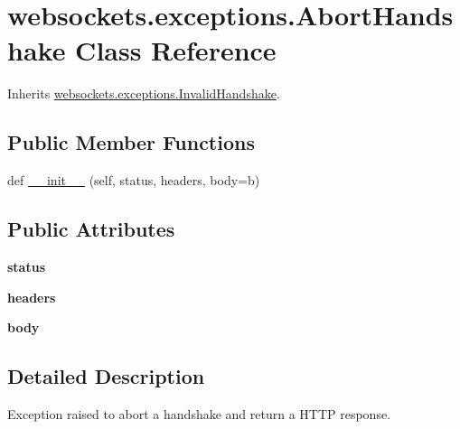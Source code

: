 \hypertarget{classwebsockets_1_1exceptions_1_1_abort_handshake}{}\section{websockets.\+exceptions.\+Abort\+Handshake Class Reference}
\label{classwebsockets_1_1exceptions_1_1_abort_handshake}


Inherits \hyperlink{classwebsockets_1_1exceptions_1_1_invalid_handshake}{websockets.\+exceptions.\+Invalid\+Handshake}.

\subsection*{Public Member Functions}
\begin{DoxyCompactItemize}
\item 
def \hyperlink{classwebsockets_1_1exceptions_1_1_abort_handshake_a0961854c8a62497d3c1ff4cc5ed4d9e0}{\+\_\+\+\_\+init\+\_\+\+\_\+} (self, status, headers, body=b\textquotesingle{}\textquotesingle{})
\end{DoxyCompactItemize}
\subsection*{Public Attributes}
\begin{DoxyCompactItemize}
\item 
\mbox{\label{classwebsockets_1_1exceptions_1_1_abort_handshake_a96e575e66ae2791615b360c3f9dcef9e}} 
{\bfseries status}
\item 
\mbox{\label{classwebsockets_1_1exceptions_1_1_abort_handshake_a4efd1b3a32bfb66ba3fdb409aad02ee3}} 
{\bfseries headers}
\item 
\mbox{\label{classwebsockets_1_1exceptions_1_1_abort_handshake_a177164eeae57ed15c71ae311ec596505}} 
{\bfseries body}
\end{DoxyCompactItemize}


\subsection{Detailed Description}
\begin{DoxyVerb}Exception raised to abort a handshake and return a HTTP response.\end{DoxyVerb}
 

